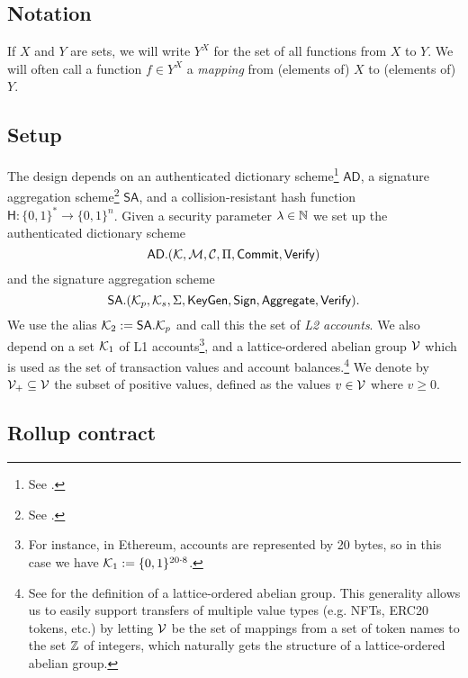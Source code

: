 \subsection{Notation}

If \(X\) and \(Y\) are sets, we will write \(Y^X\) for the set of all
functions from \(X\) to \(Y\). We will often call a function \(f \in
Y^X\) a \emph{mapping} from (elements of) \(X\) to (elements of) \(Y\).

\subsection{Setup}

The design depends on an authenticated dictionary scheme\footnote{See
.} \(\mathsf{AD}\), a
signature aggregation scheme\footnote{See
.} \(\mathsf{SA}\), and a
collision-resistant hash function \(\mathsf{H} : \{0,1\}^* \to
\{0,1\}^n\). Given a security parameter \(\lambda \in \mathbb{N}\) we set up
the authenticated dictionary scheme
\[\mathsf{AD}.(\mathcal{K},\mathcal{M},\mathcal{C},\Pi,\mathsf{Commit},\mathsf{Verify})\] and
the signature aggregation scheme \[\mathsf{SA}.(\mathcal{K}_p, \mathcal{K}_s, \Sigma,
    \mathsf{KeyGen}, \mathsf{Sign}, \mathsf{Aggregate},
\mathsf{Verify}).\] We use the alias \(\mathcal{K}_2 := \mathsf{SA}.\mathcal{K}_p\) and
call this the set of \emph{L2 accounts}. We also depend on a set
\(\mathcal{K}_1\) of L1 accounts\footnote{For instance, in Ethereum, accounts
  are represented by 20 bytes, so in this case we have \(\mathcal{K}_1 :=
\{0,1\}^{20\cdot8}\).}, and a lattice-ordered abelian group \(\mathcal{V}\)
which is used as the set of transaction values and account
balances.\footnote{See 
  for the definition of a lattice-ordered abelian group. This
  generality allows us to easily support transfers of multiple value
  types (e.g. NFTs, ERC20 tokens, etc.) by letting \(\mathcal{V}\) be the set of
  mappings from a set of token names to the set \(\mathbb{Z}\) of integers,
  which naturally gets the structure of a lattice-ordered abelian
group.} We denote by \(\mathcal{V}_+ \subseteq \mathcal{V}\) the subset of positive
values, defined as the values \(v \in \mathcal{V}\) where \(v \geq 0\).

\subsection{Rollup contract}

